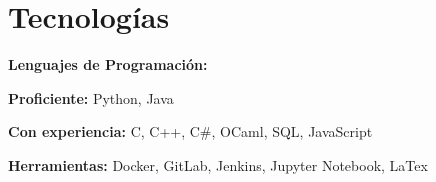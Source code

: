 \section{Tecnologías}

\begin{onecolentry}
    \textbf{Lenguajes de Programación:}
    \begin{highlights}
        \item \textbf{Proficiente:} Python, Java
        \item \textbf{Con experiencia:} C, C++, C\#, OCaml, SQL, JavaScript
    \end{highlights}
    \end{onecolentry}
    
    \vspace{0.2 cm}
    
    \begin{onecolentry}
    \textbf{Herramientas:} Docker, GitLab, Jenkins, Jupyter Notebook, LaTex
    \end{onecolentry}